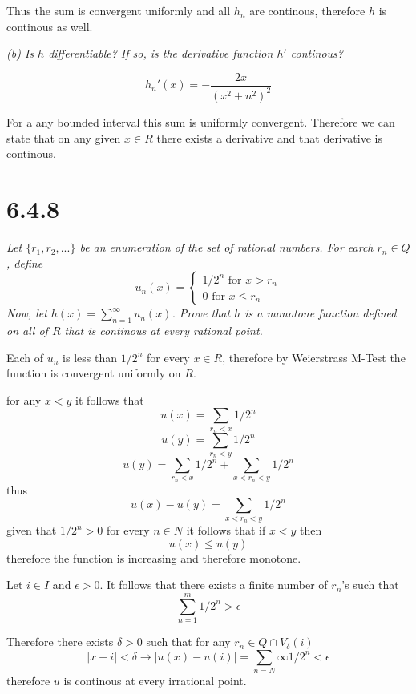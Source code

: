 \documentclass[11pt,oneside,titlepage]{book}
\begin{document}
Thus the sum is convergent uniformly and all $h_n$ are continous, therefore
$h$ is continous as well.

\textit{(b) Is $h$ differentiable? If so, is the derivative function $h'$
  continous?}

$$h_n'(x) = -\frac{2x}{(x^2 + n^2)^2}$$

For a any bounded interval this sum is uniformly convergent. Therefore
we can state that on any given $x \in R$ there exists a derivative and
that derivative is continous.

\section*{6.4.8}
\textit{Let $\{r_1, r_2, ... \}$ be an enumeration of the set of rational
  numbers. For earch $r_n \in Q$, define  }
$$u_n(x) =
\begin{cases}
  1/2^n \text{ for } x > r_n \\
  0 \text{ for } x \leq r_n
\end{cases}
$$
\textit{Now, let $h(x) = \sum_{n = 1}^{\infty}u_n(x)$. Prove that $h$ is a
  monotone function defined on all of $R$ that is continous at every rational
  point.}


Each of $u_n$ is less than $1/2^n$ for every $x \in R$,
therefore by Weierstrass M-Test the function is convergent uniformly on $R$.


for any $x < y$ it follows that
$$u(x) = \sum_{r_n < x}{1/2^n}$$
$$u(y) = \sum_{r_n < y}{1/2^n}$$
$$u(y) = \sum_{r_n < x}{1/2^n} + \sum_{x < r_n < y}{1/2^n}$$
thus
$$u(x) - u(y) = \sum_{x < r_n < y}{1/2^n}$$
given that $1/2^n > 0$ for every $n \in N$ it follows that
if $x < y$ then 
$$u(x) \leq u(y)$$
therefore the function is increasing and therefore monotone.

Let $i \in I$ and $\epsilon > 0$. It follows that there exists
a finite number of $r_n$'s such that
$$\sum_{n = 1}^m{1/2^n} > \epsilon$$

Therefore  there exists $\delta > 0$
such that for any $r_n \in Q \cap V_\delta(i)$
$$|x - i|  < \delta \to
|u(x) - u(i)| =  \sum_{n = N}{\infty}{1/2^n} < \epsilon$$
therefore $u$ is continous at every irrational point.
\end{document}
